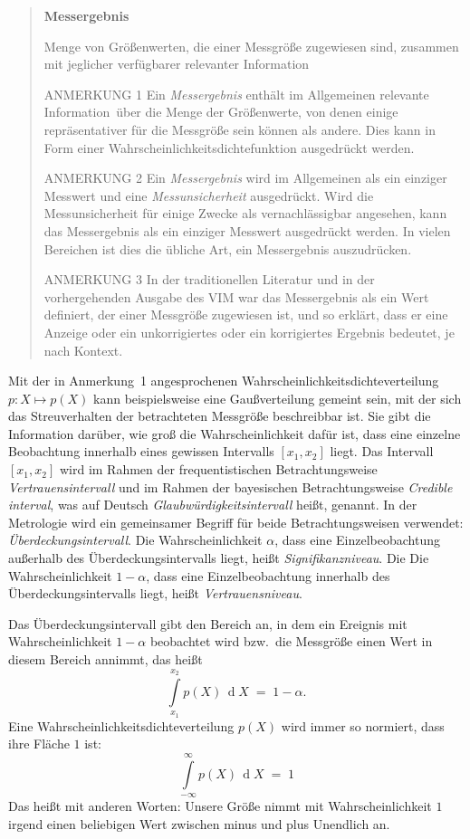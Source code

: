 \begin{quote}
\textbf{Messergebnis}

Menge von Größenwerten, die einer Messgröße zugewiesen sind, zusammen mit jeglicher
verfügbarer relevanter Information

ANMERKUNG 1 Ein \textsl{Messergebnis} enthält im Allgemeinen \glqq relevante Information\grqq ~über
die Menge der Größenwerte, von denen einige repräsentativer für die Messgröße sein können als andere.
Dies kann in Form einer Wahrscheinlichkeitsdichtefunktion ausgedrückt werden.

ANMERKUNG 2 Ein \textsl{Messergebnis} wird im Allgemeinen
als ein einziger Messwert und eine \textsl{Messunsicherheit}
ausgedrückt. Wird die Messunsicherheit für einige
Zwecke als vernachlässigbar angesehen, kann das
Messergebnis als ein einziger Messwert ausgedrückt
werden. In vielen Bereichen ist dies die übliche Art, ein
Messergebnis auszudrücken.

ANMERKUNG 3 In der traditionellen Literatur und in der
vorhergehenden Ausgabe des VIM war das Messergebnis
als ein Wert definiert, der einer Messgröße zugewiesen
ist, und so erklärt, dass er eine Anzeige oder ein
unkorrigiertes oder ein korrigiertes Ergebnis bedeutet, je
nach Kontext.
\end{quote}

Mit der in Anmerkung~1 angesprochenen Wahrscheinlichkeitsdichteverteilung $p: X \mapsto p(X)$
kann beispielsweise  eine Gaußverteilung gemeint sein, mit der sich das Streuverhalten
der betrachteten Messgröße beschreibbar ist. Sie gibt die Information darüber, wie groß die
Wahrscheinlichkeit dafür ist, dass eine einzelne Beobachtung innerhalb eines gewissen
Intervalls $[x_1, x_2]$ liegt. Das Intervall $[x_1, x_2]$ wird im Rahmen der frequentistischen
Betrachtungsweise \textsl{Vertrauensintervall} und im Rahmen der bayesischen Betrachtungsweise
\textsl{Credible interval}, was auf Deutsch \textsl{Glaubwürdigkeitsintervall} heißt, genannt.
In der Metrologie wird ein gemeinsamer Begriff für beide Betrachtungsweisen verwendet:
\textsl{Überdeckungsintervall}.
Die Wahrscheinlichkeit $\alpha$, dass eine Einzelbeobachtung außerhalb des Überdeckungsintervalls liegt,
heißt \textsl{Signifikanzniveau}. Die Die Wahrscheinlichkeit $1 - \alpha$, dass eine Einzelbeobachtung
innerhalb des Überdeckungsintervalls liegt, heißt \textsl{Vertrauensniveau}.

Das Überdeckungsintervall gibt den Bereich an, in dem ein Ereignis mit
Wahrscheinlichkeit $1-\alpha$ beobachtet wird bzw.\ die Messgröße einen Wert in diesem Bereich
annimmt, das heißt
\begin{equation}
\int\limits_{x_1}^{x_2} p(X) \, \operatorname{d} X \; = \; 1 - \alpha .
\label{eq:vertrauensniveau}
\end{equation}
Eine Wahrscheinlichkeitsdichteverteilung $p(X)$
wird immer so normiert, dass ihre Fläche $1$ ist:
\begin{equation}
\int\limits_{-\infty}^\infty p(X) \, \operatorname{d} X \; = \; 1
\end{equation}
Das heißt mit anderen Worten:
Unsere Größe nimmt mit Wahrscheinlichkeit $1$ irgend einen beliebigen
Wert zwischen minus und plus Unendlich an.

